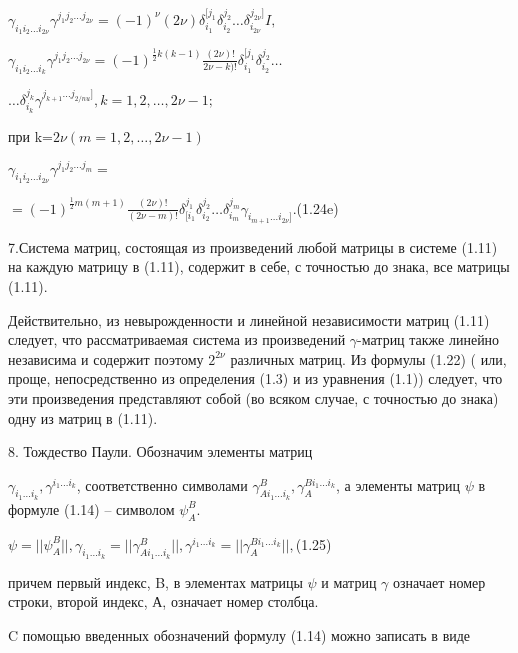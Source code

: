 \documentclass{article}
\begin{document}
{$\gamma_{i_1 i_2 \dots i_{2\nu}}\gamma^{j_1 j_2 \dots j_{2\nu}}=(-1)^{\nu}(2\nu)\delta_{i_1}^{[j_1}\delta_{i_2}^{j_2}\dots\delta_{i_{2\nu}}^{j_{2\nu}]}I,$\par
$\gamma_{i_1 i_2 \dots i_k}\gamma^{j_1 j_2 \dots j_{2\nu}}=(-1)^{\frac{1}{2}k(k-1)}\frac{(2\nu)!}{2\nu-k)!}\delta_{i_1}^{[j_1}\delta_{i_2}^{j_2}\dots$\par
\begin{center}
$\dots\delta_{i_k}^{j_k}\gamma^{j_{k+1}\dots j_{2/nu}]}, k=1,2,\dots,2\nu-1;$\par
\end{center}
при k=$2\nu (m=1,2,\dots,2\nu-1)$\par
$\gamma_{i_1 i_2 \dots i_{2\nu}}\gamma^{j_1 j_2 \dots j_m}=$\par
\hspace{0.2cm}
$=(-1)^{\frac{1}{2}m(m+1)}\frac{(2\nu)!}{(2\nu-m)!}\delta_{[i_1}^{j_1}\delta_{i_2}^{j_2}\dots\delta_{i_m}^{j_m}\gamma_{i_{m+1}\dots i_{2\nu}]}.$(1.24e)\par
7.Система матриц, состоящая из произведений любой матрицы в системе (1.11) на каждую матрицу в (1.11), содержит в себе, с точностью до знака, все матрицы (1.11).\par
Действительно, из невырожденности и линейной независимости матриц (1.11) следует, что рассматриваемая система из произведений $\gamma$-матриц также линейно независима и содержит поэтому $2^{2\nu}$ различных матриц. Из формулы (1.22) ( или, проще, непосредственно из определения (1.3) и из уравнения (1.1)) следует, что эти произведения представляют собой (во всяком случае, с точностью до знака) одну из матриц в (1.11).\par
8. Тождество Паули. Обозначим элементы матриц\par
$\gamma_{i_1 \dots i_k}, \gamma^{i_1 \dots i_k}$, соответственно символами $\gamma_{Ai_1\dots i_k}^{B}, \gamma_{A}^{Bi_1 \dots i_k}$, а элементы матриц $\psi$ в формуле (1.14) -- символом $\psi_{A}^{B}$.\par
\begin{center}
$\psi=||\psi_{A}^{B}||, \gamma_{i_1 \dots i_k}=||\gamma_{Ai_1 \dots i_k}^{B}||, \gamma^{i_1 \dots i_k}=||\gamma_{A}^{Bi_1 \dots i_k}||,$(1.25)\par
\end{center}
причем первый индекс, B, в элементах матрицы $\psi$ и матриц $\gamma$ означает номер строки, второй индекс, А, означает номер столбца.\par
C помощью введенных обозначений формулу (1.14) можно записать в виде\par
}
\end{document}
